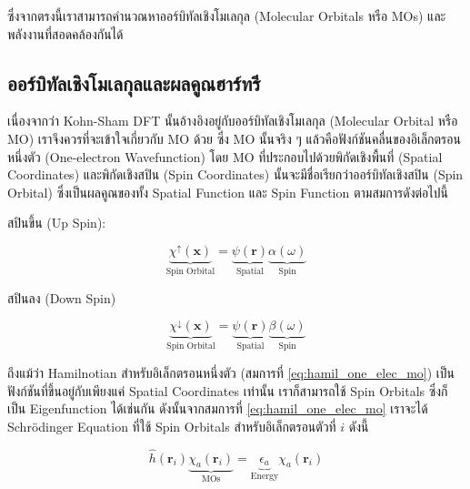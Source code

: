 \noindent ซึ่งจากตรงนี้เราสามารถคำนวณหาออร์บิทัลเชิงโมเลกุล (Molecular Orbitals หรือ MOs) และพลังงานที่สอดคล้องกันได้

\subsection{ออร์บิทัลเชิงโมเลกุลและผลคูณฮาร์ทรี}
\label{ssec:mol_orb_hartree_prod}

เนื่องจากว่า Kohn-Sham DFT นั้นอ้างอิงอยู่กับออร์บิทัลเชิงโมเลกุล (Molecular Orbital หรือ MO) เราจึงควรที่จะเข้าใจเกี่ยวกับ MO ด้วย ซึ่ง
MO นั้นจริง ๆ แล้วคือฟังก์ชันคลื่นของอิเล็กตรอนหนึ่งตัว (One-electron Wavefunction) โดย MO ที่ประกอบไปด้วยพิกัดเชิงพื้นที่ (Spatial
Coordinates) และพิกัดเชิงสปิน (Spin Coordinates) นั้นจะมีชื่อเรียกว่าออร์บิทัลเชิงสปิน (Spin Orbital) ซึ่งเป็นผลคูณของทั้ง
Spatial Function และ Spin Function ตามสมการดังต่อไปนี้

\noindent สปินขึ้น (Up Spin):

\begin{equation}\label{eq:hamil_spin_orb_up}
    \underbrace{\chi^{\uparrow}(\bm{x})}_{\text{Spin Orbital}} =
    \underbrace{\psi(\bm{r})}_{\text{Spatial}} \underbrace{\alpha(\omega)}_{\text{Spin}}
\end{equation}

\noindent สปินลง (Down Spin)

\begin{equation}\label{eq:hamil_spin_orb_down}
    \underbrace{\chi^{\downarrow}(\bm{x})}_{\text{Spin Orbital}} =
    \underbrace{\psi(\bm{r})}_{\text{Spatial}} \underbrace{\beta(\omega)}_{\text{Spin}}
\end{equation}

\noindent ถึงแม้ว่า Hamilnotian สำหรับอิเล็กตรอนหนึ่งตัว (สมการที่ \eqref{eq:hamil_one_elec_mo}) เป็นฟังก์ชันที่ขึ้นอยู่กับเพียงแค่
Spatial Coordinates เท่านั้น เราก็สามารถใช้ Spin Orbitals ซึ่งก็เป็น Eigenfunction ได้เช่นกัน ดังนั้นจากสมการที่
\eqref{eq:hamil_one_elec_mo} เราจะได้ Schr\"{o}dinger Equation ที่ใช้ Spin Orbitals สำหรับอิเล็กตรอนตัวที่ $i$ ดังนี้

\begin{equation}\label{eq:hamil_spin_orb}
    \hat{h}(\bm{r}_{i}) \underbrace{\chi_{a}(\bm{r}_{i})}_{\text{MOs}} =
    \underbrace{\epsilon_{a}}_{\text{Energy}} \chi_{a}(\bm{r}_{i})
\end{equation}

